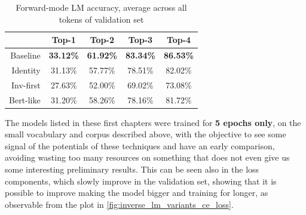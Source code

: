 \documentclass[../thesis.tex]{subfiles}
\begin{document}
\begin{table}[htbp]
\footnotesize
{}
\vspace{0.25cm}
\caption{Example completion for the given prompt, in forward mode}
\label{tab:inverse_lm__forward_mode_execution_small}
\end{table}


\begin{table}[bthp]
\centering
\begin{tabular}{rcccc}
\toprule
           & \textbf{Top-1}   & \textbf{Top-2}   & \textbf{Top-3}   & \textbf{Top-4}   \\
\midrule
Baseline   & \textbf{33.12\%} & \textbf{61.92\%} & \textbf{83.34\%} & \textbf{86.53\%} \\
Identity   & 31.13\%          & 57.77\%          & 78.51\%          & 82.02\%          \\
Inv-first  & 27.63\%          & 52.00\%          & 69.02\%          & 73.08\%          \\
Bert-like  & 31.20\%          & 58.26\%          & 78.16\%          & 81.72\%          \\
\bottomrule
\end{tabular}
\vspace{0.25cm}
\caption{Forward-mode LM accuracy, average across all tokens of validation set}
\label{table:tinystories__forward_mode_lm}
\end{table}


The models listed in these first chapters were trained for \textbf{5 epochs only}, on the small vocabulary and corpus described above, with the objective to see some signal of the potentials of these techniques and have an early comparison, avoiding wasting too many resources on something that does not even give us some interesting preliminary results.
This can be seen also in the loss components, which slowly improve in the validation set,
showing that it is possible to improve making the model bigger and training for longer, as observable from the plot in \cref{fig:inverse_lm_variants_ce_loss}.
\end{document}
